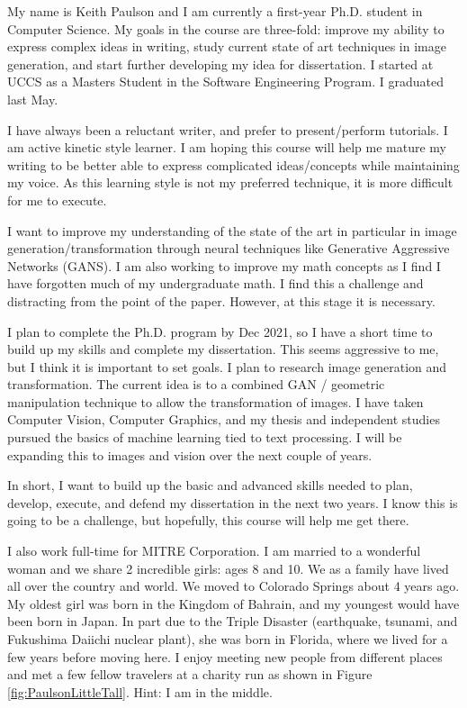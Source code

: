 
My name is Keith Paulson and I am currently a first-year Ph.D. student in Computer Science.  My goals in the course are three-fold: improve my ability to express complex ideas in writing, study current state of art techniques in image generation, and start further developing my idea for dissertation.  I started at UCCS as a Masters Student in the Software Engineering Program.  I graduated last May.  

I have always been a reluctant writer, and prefer to present/perform tutorials.  I am active kinetic style learner.  I am hoping this course will help me mature my writing to be better able to express complicated ideas/concepts while maintaining my voice. As this learning style is not my preferred technique, it is more difficult for me to execute.  

I want to improve my understanding of the state of the art in particular in image generation/transformation through neural techniques like Generative Aggressive Networks (GANS).  I am also working to improve my math concepts as I find I have forgotten much of my undergraduate math.  I find this a challenge and distracting from the point of the paper.  However, at this stage it is necessary.

I plan to complete the Ph.D. program by Dec 2021, so I have a short time to build up my skills and complete my dissertation.  This seems aggressive to me, but I think it is important to set goals.  I plan to research image generation and transformation.  The current idea is to a combined GAN / geometric manipulation technique to allow the transformation of images.  I have taken Computer Vision, Computer Graphics, and my thesis and independent studies pursued the basics of machine learning tied to text processing.  I will be expanding this to images and vision over the next couple of years.

In short, I want to build up the basic and advanced skills needed to plan, develop, execute, and defend my dissertation in the next two years.  I know this is going to be a challenge, but hopefully, this course will help me get there.  

I also work full-time for MITRE Corporation. I am married to a wonderful woman and we share 2 incredible girls: ages 8 and 10.  We as a family have lived all over the country and world. We moved to Colorado Springs about 4 years ago.    My oldest girl was born in the Kingdom of Bahrain, and my youngest would have been born in Japan. In part due to the Triple Disaster (earthquake, tsunami, and Fukushima Daiichi nuclear plant), she was born in Florida, where we lived for a few years before moving here.  I enjoy meeting new people from different places and met a few fellow travelers  at a charity run as shown in Figure  \ref{fig:PaulsonLittleTall}.  Hint: I am in the middle.

